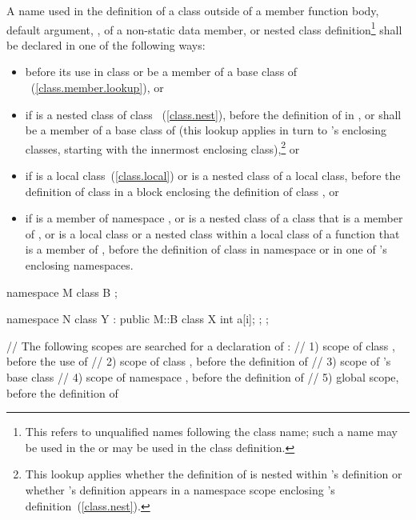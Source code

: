 \pnum
A name used in the definition of a class  outside of a member
function body, default argument, ,
 of a non-static data member,
or nested class definition\footnote{This refers to unqualified names
following the class name; such a name may be used in the
 or may be used in the class definition.}
shall be declared in one of the following ways:

\begin{itemize}
\item before its use in class  or be a member of a base class
of ~(\ref{class.member.lookup}), or
\item if  is a nested class of class
~(\ref{class.nest}), before the definition of  in
, or shall be a member of a base class of  (this
lookup applies in turn to  's enclosing classes, starting with
the innermost enclosing class),\footnote{This lookup applies whether the
definition of  is
nested within 's definition or whether 's definition
appears in a namespace scope enclosing  's
definition~(\ref{class.nest}).}
or
\item if  is a local class~(\ref{class.local}) or is a nested
class of a local class, before the definition of class  in a
block enclosing the definition of class , or
\item if  is a member of namespace , or is a nested
class of a class that is a member of , or is a local class or a
nested class within a local class of a function that is a member of
, before the definition of class  in namespace
 or in one of  's enclosing namespaces.
\end{itemize}

\enterexample 

\begin{codeblock}
namespace M {
  class B { };
}

\end{codeblock}
\begin{codeblock}
namespace N {
  class Y : public M::B {
    class X {
      int a[i];
    };
  };
}

// The following scopes are searched for a declaration of :
// 1) scope of class , before the use of 
// 2) scope of class , before the definition of 
// 3) scope of 's base class 
// 4) scope of namespace , before the definition of 
// 5) global scope, before the definition of 
\end{codeblock}


